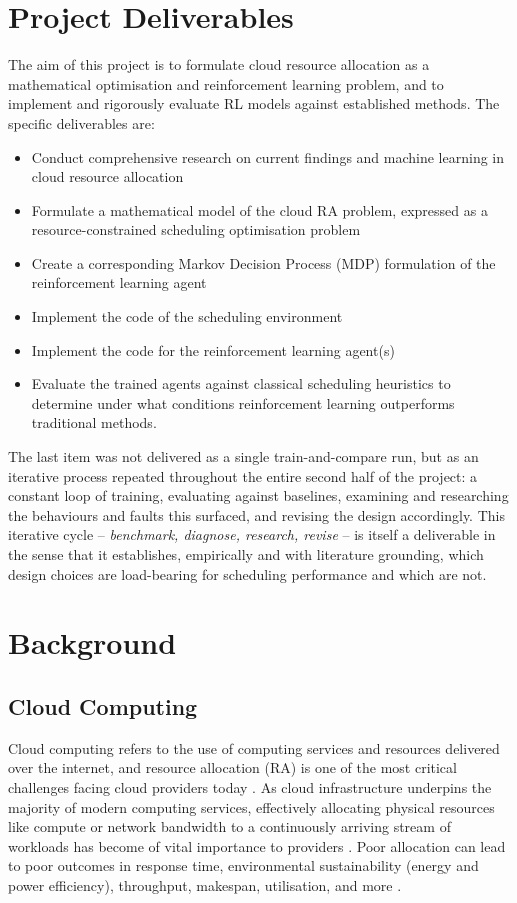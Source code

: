 \documentclass[12pt]{article}
\begin{document}
\section{Project Deliverables}
The aim of this project is to formulate cloud resource allocation as a mathematical optimisation and reinforcement learning problem, and to implement and rigorously evaluate RL models against established methods. The specific deliverables are:
\begin{itemize}
    \item Conduct comprehensive research on current findings and machine learning in cloud resource allocation
    \item Formulate a mathematical model of the cloud RA problem, expressed as a resource-constrained scheduling optimisation problem
    \item Create a corresponding Markov Decision Process (MDP) formulation of the reinforcement learning agent
    \item Implement the code of the scheduling environment
    \item Implement the code for the reinforcement learning agent(s)
    \item Evaluate the trained agents against classical scheduling heuristics to determine under what conditions reinforcement learning outperforms traditional methods.
\end{itemize}
The last item was not delivered as a single train-and-compare run, but as an iterative process repeated throughout the entire second half of the project: a constant loop of training, evaluating against baselines, examining and researching the behaviours and faults this surfaced, and revising the design accordingly. This iterative cycle -- \emph{benchmark, diagnose, research, revise} -- is itself a deliverable in the sense that it establishes, empirically and with literature grounding, which design choices are load-bearing for scheduling performance and which are not.

\section{Background}
\subsection{Cloud Computing}
Cloud computing refers to the use of computing services and resources delivered over the internet, and resource allocation (RA) is one of the most critical challenges facing cloud providers today \cite{huawei2022, saidi2023}. As cloud infrastructure underpins the majority of modern computing services, effectively allocating physical resources like compute or network bandwidth to a continuously arriving stream of workloads has become of vital importance to providers \cite{sdn2021}. Poor allocation can lead to poor outcomes in response time, environmental sustainability (energy and power efficiency), throughput, makespan, utilisation, and more \cite{cloudkpi2010, dvbpp2026, mohamaddiah2014, anuradha2014}.
\end{document}
